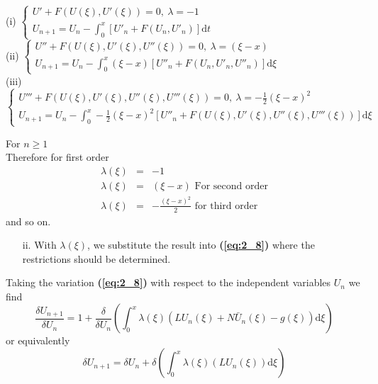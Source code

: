 \documentclass[12pt]{report}
\newcommand{\spn}[1]{\\[#1cm]}
\newcommand{\refn}[1]{\textbf{(\ref{#1})}}
\begin{document}
	\begin{flushleft}
		(i) $\left\{\begin{array}{l}
			U' + F(U(\xi), U'(\xi)) = 0, ~\lambda = -1 \\
			U_{n+1} = U_n - \int_{0}^{x}\left[U'_n + F(U_n,U'_n)\right]\text{d}t
		\end{array}\right.$\spn{0.5}
		(ii) $\left\{\begin{array}{l}
			U'' + F(U(\xi), U'(\xi), U''(\xi)) = 0, ~\lambda = (\xi - x) \\
			U_{n+1} = U_n - \int_{0}^{x}(\xi - x)\left[U''_n + F(U_n,U'_n, U''_n)\right]\text{d}\xi
		\end{array}\right.$\spn{0.5}
		(iii) $\left\{\begin{array}{l}
			U''' + F(U(\xi), U'(\xi), U''(\xi),U'''(\xi)) = 0, ~\lambda = -\frac{1}{2}(\xi - x)^2 \\
			U_{n+1} = U_n - \int_{0}^{x}-\frac{1}{2}(\xi - x)^2\left[U''_n + F(U(\xi), U'(\xi), U''(\xi),U'''(\xi))\right]\text{d}\xi
		\end{array}\right.$\spn{0.5}
	\end{flushleft}
	For $n \geq 1$\\
	Therefore for first order
	\begin{eqnarray*}
		\lambda(\xi) &=& -1\qquad\\
		\lambda(\xi) &=& (\xi - x) \text{ For second order}\\
		\lambda(\xi) &=& - \frac{(\xi - x)^2}{2} \text{ for third order}
	\end{eqnarray*}
	and so on.\\
	\begin{enumerate}
		\item[ii.] With $\lambda(\xi)$, we substitute the result into \refn{eq:2_8} where the restrictions should be determined.\\
	\end{enumerate}
	Taking the variation \refn{eq:2_8} with respect to the independent variables $U_n$ we find
	\begin{equation}
		\frac{\delta U_{n+1}}{\delta U_n} = 1 + \frac{\delta}{\delta U_n} \left(\int_{0}^{x} \lambda(\xi) (LU_n(\xi) + N\bar{U}_n(\xi) - g(\xi))\text{d}\xi\right)
	\end{equation}
	or equivalently
	\begin{equation}
		\delta U_{n+1} = \delta U_n + \delta \left(\int_{0}^{x} \lambda(\xi) (LU_n(\xi))\text{d}\xi\right) \label{eq:2_10}
	\end{equation}
	
\end{document}
